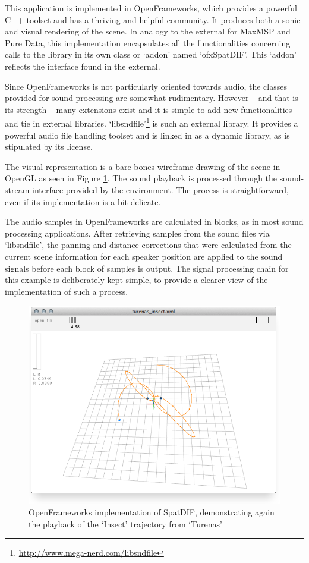 \documentclass{article}
\begin{document}
This application is implemented in OpenFrameworks, which provides a powerful C++ toolset and has a thriving and helpful community.
It produces both a sonic and visual rendering of the scene.
In analogy to the external for MaxMSP and Pure Data, this implementation encapsulates all the functionalities concerning calls to the library in its own class or `addon' named `ofxSpatDIF'.
This `addon' reflects the interface found in the external.

Since OpenFrameworks is not particularly oriented towards audio, the classes provided for sound processing are somewhat rudimentary.
However -- and that is its strength -- many extensions exist and it is simple to add new functionalities and tie in external libraries.
`libsndfile'\footnote{\url{http://www.mega-nerd.com/libsndfile}} is such an external library. 
It provides a powerful audio file handling toolset and is linked in as a dynamic library, as is stipulated by its license.

The visual representation is a bare-bones wireframe drawing of the scene in OpenGL as seen in Figure \ref{fig:screenshot3}.
The sound playback is processed through the sound-stream interface provided by the environment.
The process is straightforward, even if its implementation is a bit delicate.

The audio samples in OpenFrameworks are calculated in blocks, as in most sound processing applications.  
After retrieving samples from the sound files via `libsndfile', the panning and distance corrections that were calculated from the current scene information for each speaker position are applied to the sound signals before each block of samples is output.
The signal processing chain for this example is deliberately kept simple, to provide a clearer view of the implementation of such a process.

\begin{figure}[ht!]
	\centering
	\includegraphics[width=\columnwidth]{of_screenshot.png}
	\caption{OpenFrameworks implementation of SpatDIF, demonstrating again the playback of the `Insect' trajectory from `Turenas'} 
	\label{fig:screenshot3}
\end{figure}
\end{document}
